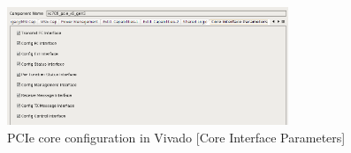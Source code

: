 \newpage

\begin{figure}[H]
\centering
\includegraphics[width=0.75\textwidth]{figures/pcie_core_coreintpar.png}
\caption{PCIe core configuration in Vivado [Core Interface Parameters]}
\label{fig:pcie_core_config11}
\end{figure}

\newpage
